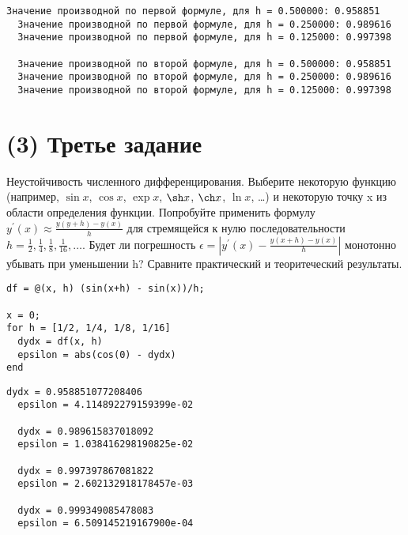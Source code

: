 \begin{lstlisting}[backgroundcolor=\color{cyan}]
  Значение производной по первой формуле, для h = 0.500000: 0.958851
  Значение производной по первой формуле, для h = 0.250000: 0.989616
  Значение производной по первой формуле, для h = 0.125000: 0.997398

  Значение производной по второй формуле, для h = 0.500000: 0.958851
  Значение производной по второй формуле, для h = 0.250000: 0.989616
  Значение производной по второй формуле, для h = 0.125000: 0.997398
\end{lstlisting}

\section{(3) Третье задание}
Неустойчивость численного дифференцирования. Выберите некоторую функцию (например, $\sin x$, $\cos x$, $\exp x$, $\sh x$, $\ch x$, $\ln x$, \ldots) и некоторую точку x из области определения функции. Попробуйте применить формулу $y^{'}(x) \approx \frac{y(y+h) - y(x)}{h}$ для стремящейся к нулю последовательности $h = \frac{1}{2}, \frac{1}{4}, \frac{1}{8}, \frac{1}{16}, \ldots$. Будет ли погрешность $\epsilon = \left |y^{'}(x) - \frac{y(x+h) - y(x)}{h} \right |$ монотонно убывать при уменьшении h? Сравните практический и теоритеческий результаты.\\[5mm]

\begin{lstlisting}
df = @(x, h) (sin(x+h) - sin(x))/h;

x = 0;
for h = [1/2, 1/4, 1/8, 1/16]
  dydx = df(x, h)
  epsilon = abs(cos(0) - dydx)
end
\end{lstlisting}

\begin{lstlisting}[backgroundcolor=\color{cyan}]
  dydx = 0.958851077208406
  epsilon = 4.114892279159399e-02

  dydx = 0.989615837018092
  epsilon = 1.038416298190825e-02

  dydx = 0.997397867081822
  epsilon = 2.602132918178457e-03

  dydx = 0.999349085478083
  epsilon = 6.509145219167900e-04
\end{lstlisting}
